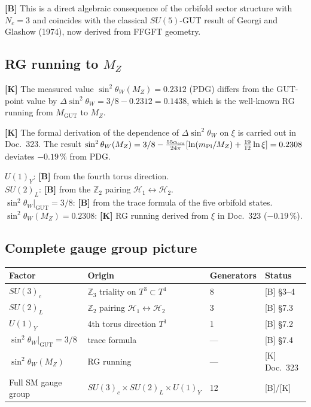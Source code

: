 \textbf{[B]} This is a direct algebraic consequence of the
orbifold sector structure with $N_c=3$ and coincides with the
classical $SU(5)$-GUT result of Georgi and Glashow (1974), now
derived from FFGFT geometry.

\subsection{RG running to $M_Z$}

\textbf{[K]} The measured value $\sin^2\theta_W(M_Z)=0.2312$ (PDG)
differs from the GUT-point value by
$\Delta\sin^2\theta_W = 3/8 - 0.2312 = 0.1438$, which is the
well-known RG running from $M_{\mathrm{GUT}}$ to $M_Z$.

\textbf{[K]} The formal derivation of the dependence of
$\Delta\sin^2\theta_W$ on $\xi$ is carried out in Doc.~323. The result
$\sin^2\theta_W(M_Z) = 3/8 - \frac{55\alpha_{\rm em}}{24\pi}
[\ln(m_{\rm Pl}/M_Z) + \frac{19}{12}\ln\xi] = 0.2308$
deviates $-0.19\,\%$ from PDG.

\begin{tcolorbox}[colback=blue!4!white, colframe=blue!45!black,
  title={Status balance $SU(2)_L\times U(1)_Y$}]
$U(1)_Y$: \textbf{[B]} from the fourth torus direction.\\
$SU(2)_L$: \textbf{[B]} from the $\mathbb{Z}_2$ pairing
$\mathcal{H}_1\leftrightarrow\mathcal{H}_2$.\\
$\sin^2\theta_W|_{\mathrm{GUT}}=3/8$: \textbf{[B]} from the
trace formula of the five orbifold states.\\
$\sin^2\theta_W(M_Z)=0.2308$: \textbf{[K]} RG running derived
from $\xi$ in Doc.~323 ($-0.19\,\%$).
\end{tcolorbox}

\subsection{Complete gauge group picture}

\begin{center}
\begin{tabular}{llll}
\toprule
Factor & Origin & Generators & Status \\
\midrule
$SU(3)_c$ & $\mathbb{Z}_3$ triality on $T^3\subset T^4$ & 8 & [B] §3--4 \\
$SU(2)_L$ & $\mathbb{Z}_2$ pairing
  $\mathcal{H}_1\leftrightarrow\mathcal{H}_2$ & 3 & [B] §7.3 \\
$U(1)_Y$  & 4th torus direction $T^1$ & 1 & [B] §7.2 \\
\midrule
$\sin^2\theta_W|_{\mathrm{GUT}}=3/8$ & trace formula & — & [B] §7.4 \\
$\sin^2\theta_W(M_Z)$ & RG running & — & [K] Doc.~323 \\
\midrule
Full SM gauge group &
  $SU(3)_c\times SU(2)_L\times U(1)_Y$ & 12 & [B]/[K] \\
\bottomrule
\end{tabular}
\end{center}

